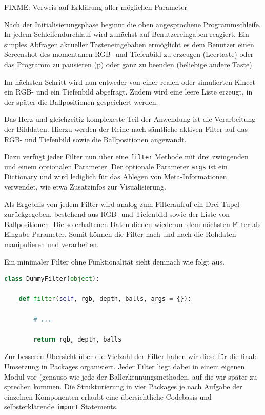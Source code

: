 \documentclass[12pt,a4paper,ngerman]{scrartcl}
\begin{document}
{\color{red}FIXME: Verweis auf Erklärung aller möglichen Parameter}

Nach der Initialisierungsphase beginnt die oben angesprochene Programmschleife.
In jedem Schleifendurchlauf wird zunächst auf Benutzereingaben reagiert.
Ein simples Abfragen aktueller Tasteneingebaben ermöglicht es dem Benutzer einen Screenshot des momentanen RGB- und Tiefenbild zu erzeugen (Leertaste) oder das Programm zu pausieren (p) oder ganz zu beenden (beliebige andere Taste).

Im nächsten Schritt wird nun entweder von einer realen oder simulierten Kinect ein RGB- und ein Tiefenbild abgefragt. Zudem wird eine leere Liste erzeugt, in der später die Ballpositionen gespeichert werden.

Das Herz und gleichzeitig komplexeste Teil der Anwendung ist die Verarbeitung der Bilddaten.
Hierzu werden der Reihe nach sämtliche aktiven Filter auf das RGB- und Tiefenbild sowie die Ballpositionen angewandt.

Dazu verfügt jeder Filter nun über eine \lstinline{filter} Methode mit drei zwingenden und einem optionalen
Parameter. Der optionale Parameter \lstinline{args} ist ein Dictionary und wird lediglich für das Ablegen von
Meta-Informationen verwendet, wie etwa Zusatzinfos zur Visualisierung.

Als Ergebnis von jedem Filter wird analog zum Filteraufruf ein Drei-Tupel zurückgegeben, bestehend aus RGB- und Tiefenbild sowie der Liste von Ballpositionen. Die so erhaltenen Daten dienen wiederum dem nächsten Filter als Eingabe-Parameter. Somit können die Filter nach und nach die Rohdaten manipulieren und verarbeiten.

Ein minimaler Filter ohne Funktionalität sieht demnach wie folgt aus.

\begin{lstlisting}[language=Python,caption={Grundstruktur eines Filters. In diesem Beispiel werden die Eingabedaten unverändert zurückgegeben.}]
class DummyFilter(object):

    def filter(self, rgb, depth, balls, args = {}):

        # ...

        return rgb, depth, balls
\end{lstlisting}

Zur besseren Übersicht über die Vielzahl der Filter haben wir diese für die finale Umsetzung in Packages organisiert. Jeder Filter liegt dabei in einem eigenen Modul vor (genauso wie jede der Ballerkennungsmethoden, auf die wir später zu sprechen kommen. Die Strukturierung in vier Packages je nach Aufgabe der einzelnen Komponenten erlaubt eine übersichtliche Codebasis und selbsterklärende \lstinline{import} Statements.
\end{document}
